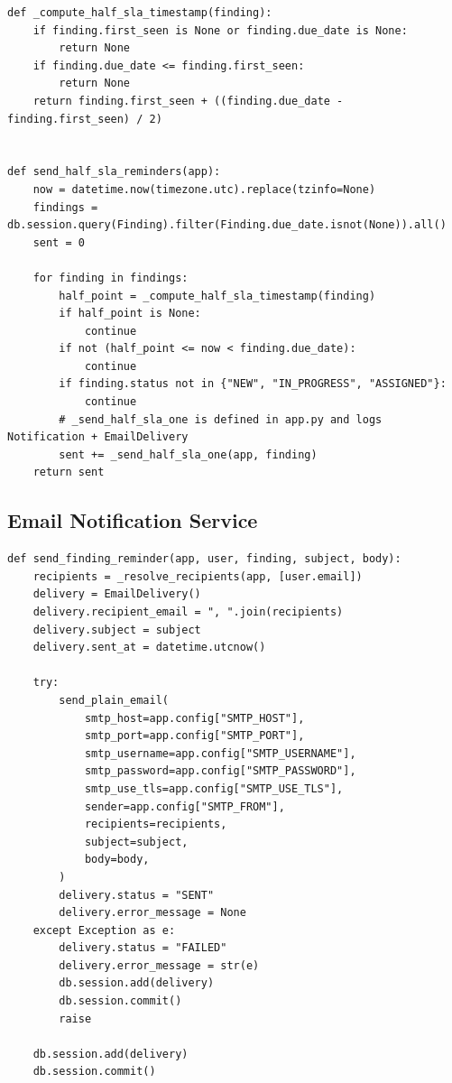 \begin{lstlisting}[style=python, caption={SLA Monitoring Service}, label={lst:slaengine}]
def _compute_half_sla_timestamp(finding):
    if finding.first_seen is None or finding.due_date is None:
        return None
    if finding.due_date <= finding.first_seen:
        return None
    return finding.first_seen + ((finding.due_date - finding.first_seen) / 2)


def send_half_sla_reminders(app):
    now = datetime.now(timezone.utc).replace(tzinfo=None)
    findings = db.session.query(Finding).filter(Finding.due_date.isnot(None)).all()
    sent = 0

    for finding in findings:
        half_point = _compute_half_sla_timestamp(finding)
        if half_point is None:
            continue
        if not (half_point <= now < finding.due_date):
            continue
        if finding.status not in {"NEW", "IN_PROGRESS", "ASSIGNED"}:
            continue
        # _send_half_sla_one is defined in app.py and logs Notification + EmailDelivery
        sent += _send_half_sla_one(app, finding)
    return sent
\end{lstlisting}

\subsection{Email Notification Service}

\begin{lstlisting}[style=python, caption={Email Notification Dispatch}, label={lst:email}]
def send_finding_reminder(app, user, finding, subject, body):
    recipients = _resolve_recipients(app, [user.email])
    delivery = EmailDelivery()
    delivery.recipient_email = ", ".join(recipients)
    delivery.subject = subject
    delivery.sent_at = datetime.utcnow()

    try:
        send_plain_email(
            smtp_host=app.config["SMTP_HOST"],
            smtp_port=app.config["SMTP_PORT"],
            smtp_username=app.config["SMTP_USERNAME"],
            smtp_password=app.config["SMTP_PASSWORD"],
            smtp_use_tls=app.config["SMTP_USE_TLS"],
            sender=app.config["SMTP_FROM"],
            recipients=recipients,
            subject=subject,
            body=body,
        )
        delivery.status = "SENT"
        delivery.error_message = None
    except Exception as e:
        delivery.status = "FAILED"
        delivery.error_message = str(e)
        db.session.add(delivery)
        db.session.commit()
        raise

    db.session.add(delivery)
    db.session.commit()
\end{lstlisting}

